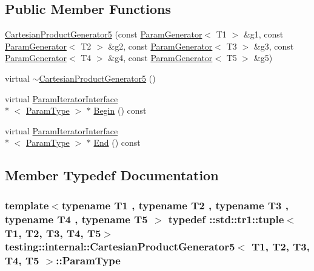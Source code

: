\subsection*{Public Member Functions}
\begin{DoxyCompactItemize}
\item 
\hyperlink{classtesting_1_1internal_1_1_cartesian_product_generator5_ab25fd0df9d6325f10f218c3b7553820d}{Cartesian\-Product\-Generator5} (const \hyperlink{classtesting_1_1internal_1_1_param_generator}{Param\-Generator}$<$ T1 $>$ \&g1, const \hyperlink{classtesting_1_1internal_1_1_param_generator}{Param\-Generator}$<$ T2 $>$ \&g2, const \hyperlink{classtesting_1_1internal_1_1_param_generator}{Param\-Generator}$<$ T3 $>$ \&g3, const \hyperlink{classtesting_1_1internal_1_1_param_generator}{Param\-Generator}$<$ T4 $>$ \&g4, const \hyperlink{classtesting_1_1internal_1_1_param_generator}{Param\-Generator}$<$ T5 $>$ \&g5)
\item 
virtual \hyperlink{classtesting_1_1internal_1_1_cartesian_product_generator5_a4f3e6916df2cdff0cb2873a8767d001e}{$\sim$\-Cartesian\-Product\-Generator5} ()
\item 
virtual \hyperlink{classtesting_1_1internal_1_1_param_iterator_interface}{Param\-Iterator\-Interface}\\*
$<$ \hyperlink{classtesting_1_1internal_1_1_cartesian_product_generator5_a081ee8effde35f8caa9ec79cf9c29cbd}{Param\-Type} $>$ $\ast$ \hyperlink{classtesting_1_1internal_1_1_cartesian_product_generator5_acc7e400a1a5d5d6eb79f9aa1ae45a7ce}{Begin} () const 
\item 
virtual \hyperlink{classtesting_1_1internal_1_1_param_iterator_interface}{Param\-Iterator\-Interface}\\*
$<$ \hyperlink{classtesting_1_1internal_1_1_cartesian_product_generator5_a081ee8effde35f8caa9ec79cf9c29cbd}{Param\-Type} $>$ $\ast$ \hyperlink{classtesting_1_1internal_1_1_cartesian_product_generator5_a8603bd7755d52d89f6e12744b46a9333}{End} () const 
\end{DoxyCompactItemize}


\subsection{Member Typedef Documentation}
\hypertarget{classtesting_1_1internal_1_1_cartesian_product_generator5_a081ee8effde35f8caa9ec79cf9c29cbd}{
\subsubsection[{Param\-Type}]{\setlength{\rightskip}{0pt plus 5cm}template$<$typename T1 , typename T2 , typename T3 , typename T4 , typename T5 $>$ typedef \-::{\bf std\-::tr1\-::tuple}$<$T1, T2, T3, T4, T5$>$ {\bf testing\-::internal\-::\-Cartesian\-Product\-Generator5}$<$ T1, T2, T3, T4, T5 $>$\-::{\bf Param\-Type}}}\label{classtesting_1_1internal_1_1_cartesian_product_generator5_a081ee8effde35f8caa9ec79cf9c29cbd}


